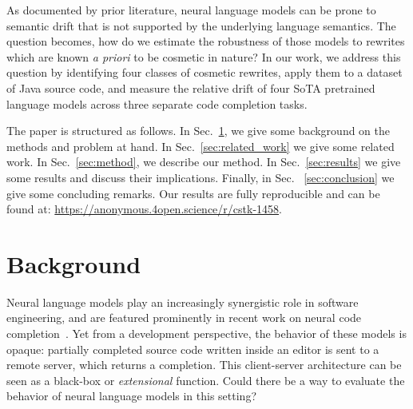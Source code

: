 \documentclass[usenames,dvipsnames]{article} %
\begin{document}
  \begin{center}
    \begin{prooftree}
    \end{prooftree}
  \end{center}

As documented by prior literature, neural language models can be prone to semantic drift that is not supported by the underlying language semantics. The question becomes, how do we estimate the robustness of those models to rewrites which are known \textit{a priori} to be cosmetic in nature? In our work, we address this question by identifying four classes of cosmetic rewrites, apply them to a dataset of Java source code, and measure the relative drift of four SoTA pretrained language models across three separate code completion tasks.

The paper is structured as follows. In Sec.~\ref{sec:background}, we give some background on the methods and problem at hand. In Sec.~\ref{sec:related_work} we give some related work. In Sec.~\ref{sec:method}, we describe our method. In Sec.~\ref{sec:results} we give some results and discuss their implications. Finally, in Sec. ~\ref{sec:conclusion} we give some concluding remarks. Our results are fully reproducible and can be found at: \url{https://anonymous.4open.science/r/cstk-1458}.

\section{Background}\label{sec:background}

Neural language models play an increasingly synergistic role in software engineering, and are featured prominently in recent work on neural code completion~\cite{chen2021evaluating}. Yet from a development perspective, the behavior of these models is opaque: partially completed source code written inside an editor is sent to a remote server, which returns a completion. This client-server architecture can be seen as a black-box or \textit{extensional} function. Could there be a way to evaluate the behavior of neural language models in this setting?
\end{document}
